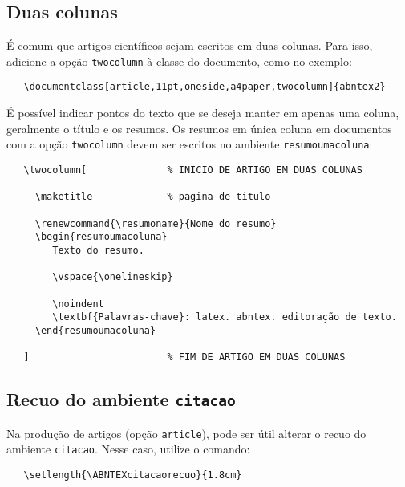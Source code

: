 \documentclass[
	article,			%
	11pt,				%
	oneside,			%
	a4paper,			%
	english,			%
	brazil,				%
	sumario=tradicional
	]{abntex2}
\begin{document}
\subsection{Duas colunas}

É comum que artigos científicos sejam escritos em duas colunas. Para isso,
adicione a opção \texttt{twocolumn} à classe do documento, como no exemplo:

\begin{verbatim}
   \documentclass[article,11pt,oneside,a4paper,twocolumn]{abntex2}
\end{verbatim}

É possível indicar pontos do texto que se deseja manter em apenas uma coluna,
geralmente o título e os resumos. Os resumos em única coluna em documentos com
a opção \texttt{twocolumn} devem ser escritos no ambiente
\texttt{resumoumacoluna}:

\begin{verbatim}
   \twocolumn[              % INICIO DE ARTIGO EM DUAS COLUNAS

     \maketitle             % pagina de titulo

     \renewcommand{\resumoname}{Nome do resumo}
     \begin{resumoumacoluna}
        Texto do resumo.
      
        \vspace{\onelineskip}
 
        \noindent
        \textbf{Palavras-chave}: latex. abntex. editoração de texto.
     \end{resumoumacoluna}
   
   ]                        % FIM DE ARTIGO EM DUAS COLUNAS
\end{verbatim}

\subsection{Recuo do ambiente \texttt{citacao}}

Na produção de artigos (opção \texttt{article}), pode ser útil alterar o recuo
do ambiente \texttt{citacao}. Nesse caso, utilize o comando:

\begin{verbatim}
   \setlength{\ABNTEXcitacaorecuo}{1.8cm}
\end{verbatim}
\end{document}
